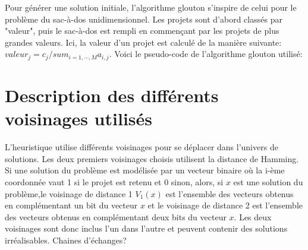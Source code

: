 \documentclass[fleqn]{article}
\begin{document}
Pour générer une solution initiale, l'algorithme glouton s'inspire de celui pour le problème du sac-à-dos unidimensionnel. Les projets sont d'abord classés par "valeur", puis le sac-à-dos est rempli en commençant par les projets de plus grandes valeurs. 
Ici, la valeur d'un projet est calculé de la manière suivante: $valeur_{j}=c_{j}/sum_{i=1,\cdots,M}a_{i,j}$.
Voici le pseudo-code de l'algorithme glouton utilisé:\\
\section{Description des différents voisinages utilisés}
L'heuristique utilise différents voisinages pour se déplacer dans l'univers de solutions. Les deux premiers voisinages choisis utilisent la distance de Hamming. 
Si une solution du problème est modélisée par un vecteur binaire où la i-ème coordonnée vaut 1 si le projet est retenu et 0 sinon, alors, si $x$ est une solution du problème,le voisinage de distance 1 $V_{1}(x)$ est l'ensemble des vecteurs obtenus en complémentant un bit du vecteur $x$ et le voisinage de distance 2 est l'ensemble des vecteurs obtenus en complémentant deux bits du vecteur $x$. 
Les deux voisinages sont donc inclus l'un dans l'autre et peuvent contenir des solutions irréalisables. 
Chaines d'échanges?
\end{document}
